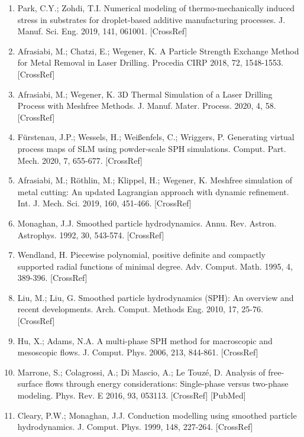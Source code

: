 \documentclass[10pt]{article}
\begin{document}
\begin{enumerate}
  \item Park, C.Y.; Zohdi, T.I. Numerical modeling of thermo-mechanically induced stress in substrates for droplet-based additive manufacturing processes. J. Manuf. Sci. Eng. 2019, 141, 061001. [CrossRef]

  \item Afrasiabi, M.; Chatzi, E.; Wegener, K. A Particle Strength Exchange Method for Metal Removal in Laser Drilling. Procedia CIRP 2018, 72, 1548-1553. [CrossRef]

  \item Afrasiabi, M.; Wegener, K. 3D Thermal Simulation of a Laser Drilling Process with Meshfree Methods. J. Manuf. Mater. Process. 2020, 4, 58. [CrossRef]

  \item Fürstenau, J.P.; Wessels, H.; Weißenfels, C.; Wriggers, P. Generating virtual process maps of SLM using powder-scale SPH simulations. Comput. Part. Mech. 2020, 7, 655-677. [CrossRef]

  \item Afrasiabi, M.; Röthlin, M.; Klippel, H.; Wegener, K. Meshfree simulation of metal cutting: An updated Lagrangian approach with dynamic refinement. Int. J. Mech. Sci. 2019, 160, 451-466. [CrossRef]

  \item Monaghan, J.J. Smoothed particle hydrodynamics. Annu. Rev. Astron. Astrophys. 1992, 30, 543-574. [CrossRef]

  \item Wendland, H. Piecewise polynomial, positive definite and compactly supported radial functions of minimal degree. Adv. Comput. Math. 1995, 4, 389-396. [CrossRef]

  \item Liu, M.; Liu, G. Smoothed particle hydrodynamics (SPH): An overview and recent developments. Arch. Comput. Methods Eng. 2010, 17, 25-76. [CrossRef]

  \item Hu, X.; Adams, N.A. A multi-phase SPH method for macroscopic and mesoscopic flows. J. Comput. Phys. 2006, 213, 844-861. [CrossRef]

  \item Marrone, S.; Colagrossi, A.; Di Mascio, A.; Le Touzé, D. Analysis of free-surface flows through energy considerations: Single-phase versus two-phase modeling. Phys. Rev. E 2016, 93, 053113. [CrossRef] [PubMed]

  \item Cleary, P.W.; Monaghan, J.J. Conduction modelling using smoothed particle hydrodynamics. J. Comput. Phys. 1999, 148, 227-264. [CrossRef]


\end{enumerate}
\end{document}

